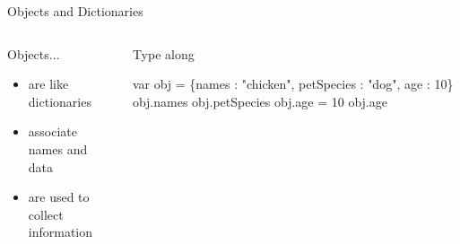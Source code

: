 \documentclass{beamer}
\begin{document}


\begin{frame}[fragile]{Objects and Dictionaries}
  \begin{columns}[T]
    \begin{column}{0.4\columnwidth}
      \begin{block}{Objects...}
        \begin{itemize}
          \item<1,2> are like dictionaries
          \item<1,3> associate names and data
          \item<1,4> are used to collect information
        \end{itemize}
      \end{block}
    \end{column}

    \begin{column}{0.5\columnwidth}
      \begin{block}{Type along}
\begin{semiverbatim}
var obj = \{names : "chicken", 
           petSpecies : "dog", 
           age : 10\}
obj.names
obj.petSpecies
obj.age = 10
obj.age
\end{semiverbatim}
      \end{block}
    \end{column}
  \end{columns}
\end{frame}
\end{document}
